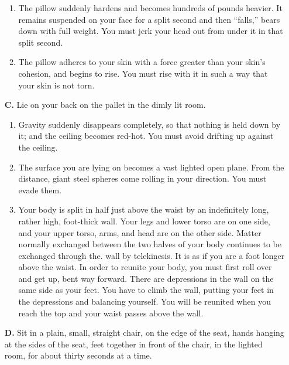 \begin{itemize}[label={}. wide, nosep, itemsep=0.5em]
\lilskip
\begin{enumerate}
\item The pillow suddenly hardens and becomes hundreds of pounds heavier. It 
remains suspended on your face for a split second and then \enquote{falls,} bears 
down with full weight. You must jerk your head out from under it in that 
split second. 

\item The pillow adheres to your skin with a force greater than your skin's 
cohesion, and begins to rise. You must rise with it in such a way that your 
skin is not torn. 
\end{enumerate}

\item[\textbf{C.}] Lie on your back on the pallet in the dimly lit room. 

\lilskip

\begin{enumerate}
\item Gravity suddenly disappears completely, so that nothing is held down by 
it; and the ceiling becomes red-hot. You must avoid drifting up against the 
ceiling. 

\item The surface you are lying on becomes a vast lighted open plane. From the 
distance, giant steel spheres come rolling in your direction. You must evade 
them. 

\item Your body is split in half just above the waist by an indefinitely long, 
rather high, foot-thick wall. Your legs and lower torso are on one side, and 
your upper torso, arms, and head are on the other side. Matter normally 
exchanged between the two halves of your body continues to be exchanged 
through the. wall by telekinesis. It is as if you are a foot longer above the 
waist. In order to reunite your body, you must first roll over and get up, 
bent way forward. There are depressions in the wall on the same side as your 
feet. You have to climb the wall, putting your feet in the depressions and 
balancing yourself. You will be reunited when you reach the top and your 
waist passes above the wall. 
\end{enumerate}

\item[\textbf{D.}] Sit in a plain, small, straight chair, on the edge of the seat, hands 
hanging at the sides of the seat, feet together in front of the chair, in the 
lighted room, for about thirty seconds at a time. 


\end{itemize}
